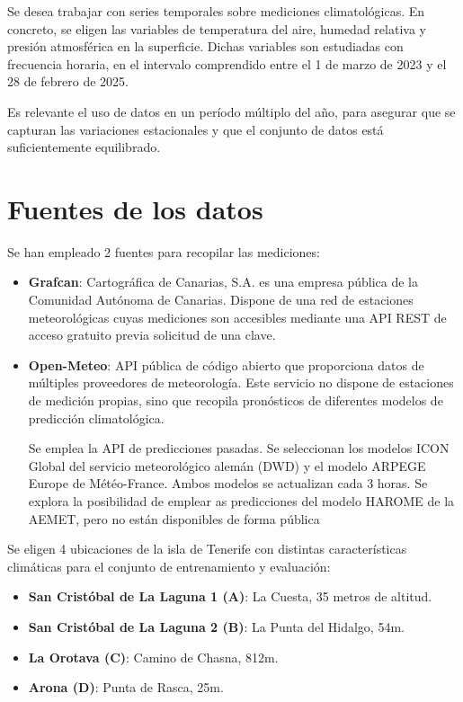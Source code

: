 
Se desea trabajar con series temporales sobre mediciones climatológicas. 
En concreto, se eligen las variables de temperatura del aire, humedad relativa y presión atmosférica en la superficie.
Dichas variables son estudiadas con frecuencia horaria, en el intervalo comprendido entre el 1 de marzo de 2023 y el 28 de febrero de 2025.

Es relevante el uso de datos en un período múltiplo del año, para asegurar que se capturan las variaciones estacionales y que el conjunto de datos está suficientemente equilibrado.

\section{Fuentes de los datos}

Se han empleado 2 fuentes para recopilar las mediciones: 
\begin{itemize}
    \item \textbf{Grafcan}: Cartográfica de Canarias, S.A. es una empresa pública de la Comunidad Autónoma de Canarias. Dispone de una red de estaciones meteorológicas cuyas
    mediciones son accesibles mediante una API REST de acceso gratuito previa solicitud de una clave\cite{grafcan_sensores}. 
    \item \textbf{Open-Meteo}: API pública de código abierto que proporciona datos de múltiples proveedores de meteorología. Este servicio no dispone de estaciones de medición
    propias, sino que recopila pronósticos de diferentes modelos de predicción climatológica. 

    Se emplea la API de predicciones pasadas\cite{open_meteo_api}. Se seleccionan los modelos ICON Global del servicio meteorológico alemán (DWD) y el modelo ARPEGE Europe de Météo-France. Ambos modelos se actualizan cada 3 horas. 
    Se explora la posibilidad de emplear as predicciones del modelo HAROME de la AEMET, pero no están disponibles de forma pública
\end{itemize}

Se eligen 4 ubicaciones de la isla de Tenerife con distintas características climáticas para el conjunto de entrenamiento y evaluación:
\begin{itemize}
    \item \textbf{San Cristóbal de La Laguna 1 (A)}: La Cuesta, 35 metros de altitud.
    \item \textbf{San Cristóbal de La Laguna 2 (B)}: La Punta del Hidalgo, 54m.
    \item \textbf{La Orotava (C)}: Camino de Chasna, 812m.
    \item \textbf{Arona (D)}: Punta de Rasca, 25m.
\end{itemize}

